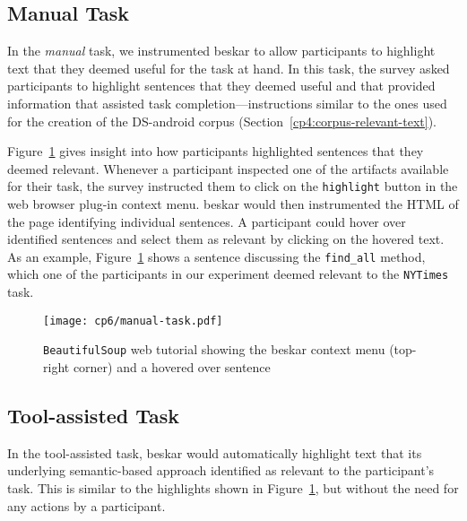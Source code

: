 \subsection{Manual Task}
\label{cp6:procedures-manual}



In the \textit{manual} task, we instrumented \acs{beskar} to allow participants to highlight text that they deemed useful for the task at hand. In this task, 
the survey asked participants to highlight sentences that they deemed useful and that provided information that assisted task completion---instructions similar to the ones used for the creation of the \acs{DS-android} corpus (Section~\ref{cp4:corpus-relevant-text}).



Figure~\ref{fig:artifact-pre-highlight}
gives insight into how participants highlighted sentences that they deemed relevant. 
Whenever a participant inspected one of the artifacts available for their task, 
the survey instructed them to click on the \texttt{highlight} button in the web browser plug-in context menu.  
\acs{beskar} would then instrumented the HTML of the page identifying individual sentences. 
A participant could hover over identified sentences and select them as relevant by clicking on the hovered text.
As an example, Figure~\ref{fig:artifact-pre-highlight} shows a sentence discussing the \texttt{find\_all} method, which 
one of the participants in our experiment deemed 
relevant to the \texttt{NYTimes} task.



\begin{figure}
    \centering
    \texttt{[image: cp6/manual-task.pdf]}
    \caption{\texttt{BeautifulSoup} web tutorial showing the \acs{beskar} context menu (top-right corner) and a hovered over sentence}
    \label{fig:artifact-pre-highlight}
\end{figure}




\subsection{Tool-assisted Task}
\label{cp6:procedures-tool-assisted}


In the tool-assisted task, \acs{beskar} would automatically highlight text that 
its underlying semantic-based approach identified as relevant to the participant's task.
This is similar to the highlights shown in Figure~\ref{fig:artifact-pre-highlight}, but without the need for any actions by a participant.


